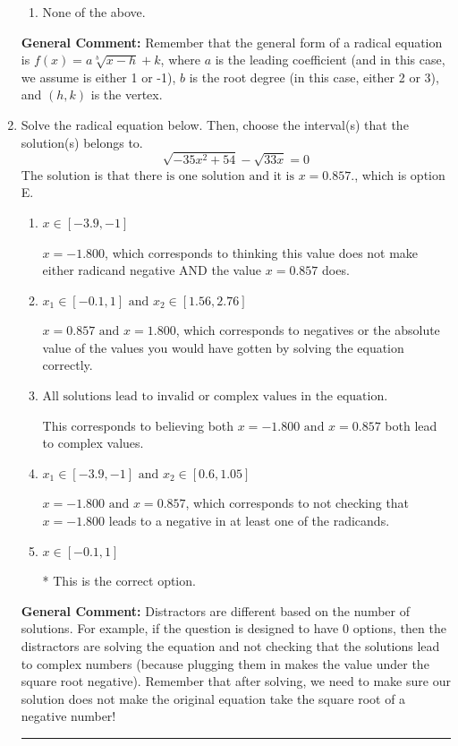 \documentclass{extbook}[14pt]
\newcommand{\litem}[1]{\item #1

\rule{\textwidth}{0.4pt}}
\begin{document}
\begin{enumerate}
{\begin{enumerate}[label=\Alph*.]
\begin{multicols}{2}
\end{multicols}\item None of the above.\end{enumerate}
\textbf{General Comment:} Remember that the general form of a radical equation is $ f(x) = a \sqrt[b]{x - h} + k $, where $a$ is the leading coefficient (and in this case, we assume is either 1 or -1), $b$ is the root degree (in this case, either 2 or 3), and $(h, k)$ is the vertex.
}
\litem{
Solve the radical equation below. Then, choose the interval(s) that the solution(s) belongs to.
\[ \sqrt{-35 x^2 + 54} - \sqrt{33 x} = 0 \]The solution is \( \text{that there is one solution and it is } x = 0.857. \), which is option E.\begin{enumerate}[label=\Alph*.]
\item \( x \in [-3.9,-1] \)

$x = -1.800$, which corresponds to thinking this value does not make either radicand negative AND the value $x = 0.857$ does.
\item \( x_1 \in [-0.1, 1] \text{ and } x_2 \in [1.56,2.76] \)

$x = 0.857 \text{ and } x = 1.800$, which corresponds to negatives or the absolute value of the values you would have gotten by solving the equation correctly.
\item \( \text{All solutions lead to invalid or complex values in the equation.} \)

This corresponds to believing both $x = -1.800 \text{ and } x = 0.857$ both lead to complex values.
\item \( x_1 \in [-3.9, -1] \text{ and } x_2 \in [0.6,1.05] \)

$x = -1.800 \text{ and } x = 0.857$, which corresponds to not checking that $x = -1.800$ leads to a negative in at least one of the radicands.
\item \( x \in [-0.1,1] \)

* This is the correct option.
\end{enumerate}

\textbf{General Comment:} Distractors are different based on the number of solutions. For example, if the question is designed to have 0 options, then the distractors are solving the equation and not checking that the solutions lead to complex numbers (because plugging them in makes the value under the square root negative). Remember that after solving, we need to make sure our solution does not make the original equation take the square root of a negative number!
}
\end{enumerate}
\end{document}
